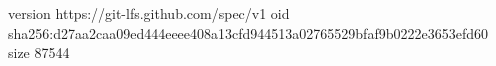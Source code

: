 version https://git-lfs.github.com/spec/v1
oid sha256:d27aa2caa09ed444eeee408a13cfd944513a02765529bfaf9b0222e3653efd60
size 87544
